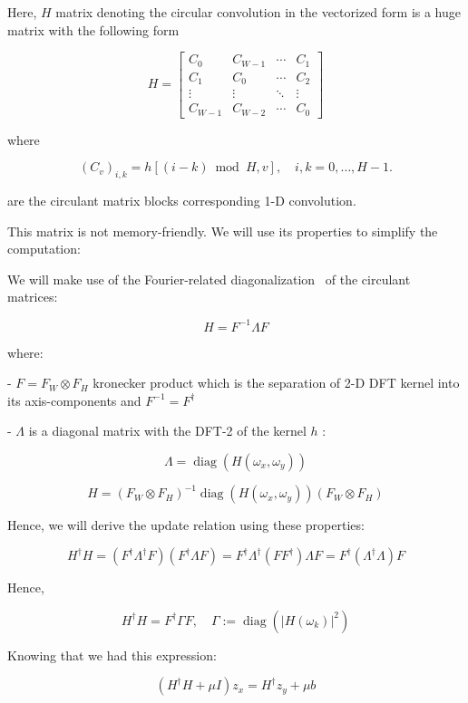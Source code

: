 \documentclass{article}
\theoremstyle{definition}
\begin{document}
Here, $H$ matrix denoting the circular convolution in the vectorized form is a huge matrix with the following form~\cite{Circulant}

$$
H=\left[\begin{array}{cccc}
C_0 & C_{W-1} & \cdots & C_1 \\
C_1 & C_0 & \cdots & C_2 \\
\vdots & \vdots & \ddots & \vdots \\
C_{W-1} & C_{W-2} & \cdots & C_0
\end{array}\right]
$$



where 

$$
\left(C_v\right)_{i, k}=h[(i-k) \bmod H, v], \quad i, k=0, \ldots, H-1 .
$$

are the circulant matrix blocks corresponding 1-D convolution.

This matrix is not memory-friendly. We will use its properties to simplify the computation:

We will make use of the Fourier-related  diagonalization~\cite{Circulant} of the circulant matrices:


$$
H=F^{-1} \Lambda F
$$

where:

- $F=F_W \otimes F_H$ kronecker product which is the separation of 2-D DFT kernel into its axis-components and $F^{-1}=F^{\dagger}$

- $\Lambda$ is a diagonal matrix with the DFT-2 of the kernel $h$ :

$$
\Lambda=\operatorname{diag}\left(H\left(\omega_x, \omega_y\right)\right)
$$


$$
H=\left(F_W \otimes F_H\right)^{-1} \operatorname{diag}\left(H\left(\omega_x, \omega_y\right)\right)\left(F_W \otimes F_H\right)
$$



Hence, we will derive the update relation using these properties:


$$
H^{\dagger} H=\left(F^{\dagger}\Lambda^{\dagger} F\right)\left(F^{\dagger} \Lambda F\right)=F^{\dagger} \Lambda^{\dagger}\left(F F^{\dagger}\right) \Lambda F=F^{\dagger}\left(\Lambda^{\dagger} \Lambda\right) F
$$

Hence,

$$
H^{\dagger} H=F^{\dagger} \Gamma F, \quad \Gamma:=\operatorname{diag}\left(\left|H\left(\omega_k\right)\right|^2\right)
$$


Knowing that we had this expression:

$$
\left(H^{\dagger} H+\mu I\right) z_x=H^{\dagger} z_y+\mu b
$$
\end{document}
